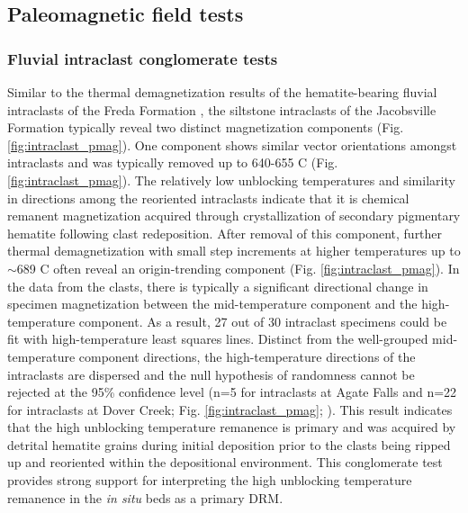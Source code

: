 \subsection*{Paleomagnetic field tests}

\subsubsection*{Fluvial intraclast conglomerate tests}

Similar to the thermal demagnetization results of the hematite-bearing fluvial intraclasts of the Freda Formation \citep{Swanson-Hysell2019b}, the siltstone intraclasts of the Jacobsville Formation typically reveal two distinct magnetization components (Fig. \ref{fig:intraclast_pmag}). One component shows similar vector orientations amongst intraclasts and was typically removed up to 640-655 \textdegree C (Fig. \ref{fig:intraclast_pmag}). The relatively low unblocking temperatures and similarity in directions among the reoriented intraclasts indicate that it is chemical remanent magnetization acquired through crystallization of secondary pigmentary hematite following clast redeposition. After removal of this component, further thermal demagnetization with small step increments at higher temperatures up to $\sim$689 \textdegree C often reveal an origin-trending component (Fig. \ref{fig:intraclast_pmag}). In the data from the clasts, there is typically a significant directional change in specimen magnetization between the mid-temperature component and the high-temperature component. As a result, 27 out of 30 intraclast specimens could be fit with high-temperature least squares lines. Distinct from the well-grouped mid-temperature component directions, the high-temperature directions of the intraclasts are dispersed and the null hypothesis of randomness cannot be rejected at the 95\% confidence level (n=5 for intraclasts at Agate Falls and n=22 for intraclasts at Dover Creek; Fig. \ref{fig:intraclast_pmag}; \cite{Watson1956a}). This result indicates that the high unblocking temperature remanence is primary and was acquired by detrital hematite grains during initial deposition prior to the clasts being ripped up and reoriented within the depositional environment. This conglomerate test provides strong support for interpreting the high unblocking temperature remanence in the \textit{in situ} beds as a primary DRM. 

